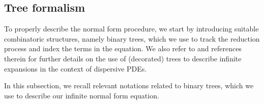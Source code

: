 \documentclass[%
11pt,  reqno]{amsart}
\newcommand{\5}{\textup{V}}
\newcommand{\noi}{\noindent}
\theoremstyle{remark}
\numberwithin{equation}{section}
\numberwithin{theorem}{section}
\newcommand{\andreia}[1]{\marginpar{\color{purple} $\Leftarrow\Leftarrow\Leftarrow$}{\smallskip \noi\color{purple}ANDREIA: #1}\smallskip}
\begin{document}



\subsection{Tree formalism}	
\label{SUB:tree}


To properly describe the normal form procedure, we start by introducing suitable combinatoric structures, namely  binary trees, which we use to track the reduction process and index the terms in the equation. 
We also refer to \cite{Bruned, Christ_power, GuoKwonOh_nls,kishimoto, KOY20} and references therein for further details on the use of (decorated) trees to describe infinite expansions in the context of dispersive PDEs. 

In this subsection, we recall relevant notations related to binary trees, which we use to describe our infinite normal form equation.
\end{document}
